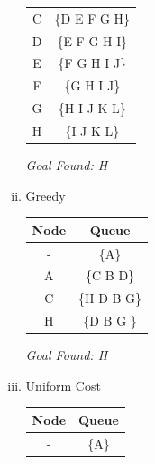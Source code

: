 \documentclass[12pt]{article}%
\begin{document}
\begin{enumerate}[(a)]
\begin{enumerate}[i.]
\begin{center}
\begin{tabular}{c | c}
            C & \{D E F G H\}  \\
            D & \{E F G H I\}  \\
            E & \{F G H I J\}  \\
            F & \{G H I J\}  \\
            G & \{H I J K L\}  \\ 
            H & \{I J K L\}  \\  [1ex] %
            \hline %
        \end{tabular}\hfill\null
        \end{center}
        \begin{center}
            \textit{Goal Found: H}
        \end{center}
    \break
    \item
        Greedy
        \newline
        \begin{center}
        \hfill\begin{tabular}{c | c} %
            \hline\hline %
            Node & Queue \\ [0.5ex] %
            \hline %
            - & \{A\}  \\ %
            A & \{C B D\}  \\
            C & \{H D B G\}  \\ 
            H & \{D B G \}  \\ [1ex] %
            \hline %
        \end{tabular}\hfill\null
        \end{center}
        \begin{center}
            \textit{Goal Found: H}
        \end{center}
    \item
        Uniform Cost
        \newline
        \begin{center}
        \hfill\begin{tabular}{c | c} %
            \hline\hline %
            Node & Queue \\ [0.5ex] %
            \hline %
            - & \{A\}  \\ %

\end{tabular}
\end{center}
\end{enumerate}
\end{enumerate}
\end{document}
